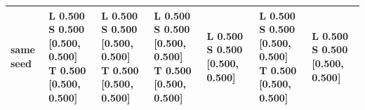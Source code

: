 \begin{tabular}{lllllll}
same seed & \makecell[l]{L 0.500\\ S 0.500 [0.500, 0.500]\\ T 0.500 [0.500, 0.500]} & \makecell[l]{L 0.500\\ S 0.500 [0.500, 0.500]\\ T 0.500 [0.500, 0.500]} & \makecell[l]{L 0.500\\ S 0.500 [0.500, 0.500]\\ T 0.500 [0.500, 0.500]} & \makecell[l]{L 0.500\\ S 0.500 [0.500, 0.500]} & \makecell[l]{L 0.500\\ S 0.500 [0.500, 0.500]\\ T 0.500 [0.500, 0.500]} & \makecell[l]{L 0.500\\ S 0.500 [0.500, 0.500]} \\
\bottomrule
\end{tabular}
